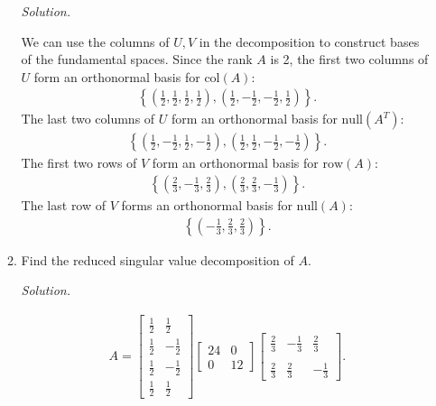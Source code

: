 \documentclass{article}
\begin{document}
\begin{enumerate}
\begin{enumerate}
\emph{Solution.}

We can use the columns of $U,V$ in the decomposition to construct bases of the fundamental spaces.
Since the rank $A$ is 2, the first two columns of $U$ form an orthonormal basis for $\text{col}(A)$:
	\begin{align*}
	\left\{ \left(\frac{1}{2},\frac{1}{2},\frac{1}{2},\frac{1}{2}\right),\left(\frac{1}{2},-\frac{1}{2},-\frac{1}{2},\frac{1}{2}\right)\right\}.
	\end{align*}
The last two columns of $U$ form an orthonormal basis for $\text{null}(A^T)$:
	\begin{align*}
	\left\{ \left(\frac{1}{2},-\frac{1}{2},\frac{1}{2},-\frac{1}{2}\right),\left(\frac{1}{2},\frac{1}{2},-\frac{1}{2},-\frac{1}{2}\right)\right\}.
	\end{align*}
The first two rows of $V$ form an orthonormal basis for $\text{row}(A)$:
	\begin{align*}
	\left\{\left(\frac{2}{3},-\frac{1}{3},\frac{2}{3}\right),\left(\frac{2}{3},\frac{2}{3},-\frac{1}{3}\right)\right\}.	
	\end{align*}
The last row of $V$ forms an orthonormal basis for $\text{null}(A)$:
	\begin{align*}
	\left\{\left(-\frac{1}{3},\frac{2}{3},\frac{2}{3}\right)\right\}.	
	\end{align*}

\item Find the reduced singular value decomposition of $A$.

\emph{Solution.}

	\begin{align*}
	A=\left[ \begin{array}{rrr} \frac{1}{2}	&\frac{1}{2} \\ \frac{1}{2}&-\frac{1}{2}\\ \frac{1}{2}&-\frac{1}{2} \\ \frac{1}{2}&\frac{1}{2}\end{array}\right]\left[\begin{array}{lll} 24&0 \\ 0&12 \end{array}\right] \left[\begin{array}{rrr}\frac{2}{3} &-\frac{1}{3} & \frac{2}{3}\\ \\\frac{2}{3} & \frac{2}{3} & -\frac{1}{3} \end{array}\right].
	\end{align*}
\end{enumerate}


\end{enumerate}
\end{document}
